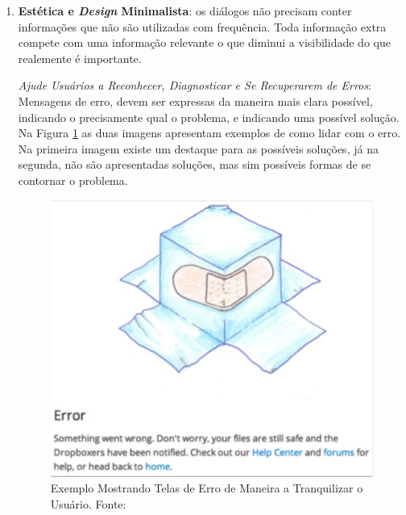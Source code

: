 \begin{enumerate}
\item\textbf{Estética e \textit{Design} Minimalista}: os diálogos não precisam conter informações que não são utilizadas com frequência. Toda informação extra compete com uma informação relevante o que diminui a visibilidade do que realemente é importante.

\textit{Ajude Usuários a Reconhecer, Diagnosticar e Se Recuperarem de Erros}: Mensagens de erro, devem ser expressas da maneira mais clara possível, indicando o precisamente qual o problema, e indicando uma possível solução. Na Figura \ref{img:princ9} as duas imagens apresentam exemplos de como lidar com o erro. Na primeira imagem existe um destaque para as possíveis soluções, já na segunda, não são apresentadas soluções, mas sim possíveis formas de se contornar o problema.
 \graphicspath{{figuras/}}
  \begin{figure}[h!]
  \centering
  \includegraphics[scale=0.60]{princ_9.png}
  \caption{Exemplo Mostrando Telas de Erro de Maneira a Tranquilizar o Usuário. Fonte: \cite{pres_usabilidade}}
  \label{img:princ9}
  \end{figure}  
  

\end{enumerate}
